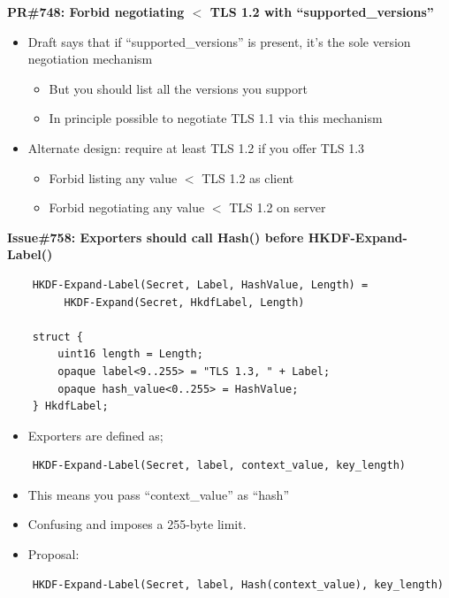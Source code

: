 \documentclass[helvetica]{seminar}
\newcommand{\heading}[1]{%
  \begin{center} 
    \large\bf 
    #1 
  \end{center} 
  \vspace{.4 in}}
\begin{document}
\begin{slide}
\heading{PR\#748: Forbid negotiating $<$ TLS 1.2 with ``supported\_versions''}

\begin{itemize}
\item Draft says that if ``supported\_versions'' is present, it's the sole version negotiation mechanism
  \begin{itemize}
  \item But you should list all the versions you support
  \item In principle possible to negotiate TLS 1.1 via this mechanism
  \end{itemize}
\item Alternate design: require at least TLS 1.2 if you offer TLS 1.3
  \begin{itemize}
  \item Forbid listing any value $<$ TLS 1.2 as client
  \item Forbid negotiating any value $<$ TLS 1.2 on server
  \end{itemize}
\end{itemize}
\end{slide}


\begin{slide}
\heading{Issue\#758: Exporters should call Hash() before HKDF-Expand-Label()}

\vspace{-6ex}
{\scriptsize
\begin{verbatim}
    HKDF-Expand-Label(Secret, Label, HashValue, Length) =
         HKDF-Expand(Secret, HkdfLabel, Length)

    struct {
        uint16 length = Length;
        opaque label<9..255> = "TLS 1.3, " + Label;
        opaque hash_value<0..255> = HashValue;
    } HkdfLabel;
\end{verbatim}
}

\begin{itemize}
\item Exporters are defined as;
\end{itemize}

{\scriptsize
\begin{verbatim}
    HKDF-Expand-Label(Secret, label, context_value, key_length)
\end{verbatim}
}

\begin{itemize}
\item This means you pass ``context\_value'' as ``hash''
\item Confusing and imposes a 255-byte limit.
\item Proposal:
\end{itemize}

{\scriptsize
\begin{verbatim}
    HKDF-Expand-Label(Secret, label, Hash(context_value), key_length)
\end{verbatim}
}
\end{slide}
\end{document}
